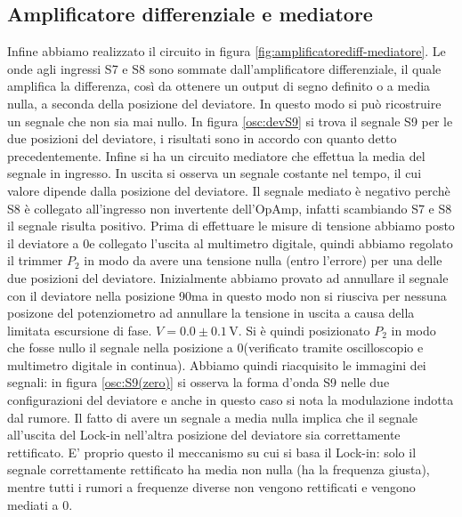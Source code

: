 \documentclass[10pt,a4paper]{article}
\begin{document}
\subsection{Amplificatore differenziale e mediatore}
Infine abbiamo realizzato il circuito in figura \ref{fig:amplificatorediff-mediatore}. Le onde agli ingressi S7 e S8 sono sommate dall'amplificatore differenziale, il quale amplifica la differenza, così da ottenere un output di segno definito o a media nulla, a seconda della posizione del deviatore. In questo modo si può ricostruire un segnale che non sia mai nullo.
In figura \ref{osc:devS9} si trova il segnale S9 per le due posizioni del deviatore, i risultati sono in accordo con quanto detto precedentemente.
Infine si ha un circuito mediatore che effettua la media del segnale in ingresso. In uscita si osserva un segnale costante nel tempo, il cui valore dipende dalla posizione del deviatore. %
Il segnale mediato è negativo perchè S8 è collegato all'ingresso non invertente dell'OpAmp, infatti scambiando S7 e S8 il segnale risulta positivo.
 Prima di effettuare le misure di tensione abbiamo posto il deviatore a 0\degree e collegato l'uscita al multimetro digitale, quindi abbiamo regolato il trimmer $P_2$ in modo da avere una tensione nulla (entro l'errore) per una delle due posizioni del deviatore. Inizialmente abbiamo provato ad annullare il segnale con il deviatore nella posizione 90\degree ma in questo modo non si riusciva per nessuna posizone del potenziometro ad annullare la tensione in uscita a causa della limitata escursione di fase. $V=0.0\pm0.1\,\mbox{V}$. Si è quindi posizionato $P_2$ in modo che fosse nullo il segnale nella posizione a 0\degree (verificato tramite oscilloscopio e multimetro digitale in continua). Abbiamo quindi riacquisito le immagini dei segnali: in figura \ref{osc:S9(zero)} si osserva la forma d'onda S9 nelle due configurazioni del deviatore e anche in questo caso si nota la modulazione indotta dal rumore. Il fatto di avere un segnale a media nulla implica che il segnale all'uscita del Lock-in nell'altra posizione del deviatore sia correttamente rettificato. E' proprio questo il meccanismo su cui si basa il Lock-in: solo il segnale correttamente rettificato ha media non nulla (ha la frequenza giusta), mentre tutti i rumori a frequenze diverse non vengono rettificati e vengono mediati a 0.
\end{document}
